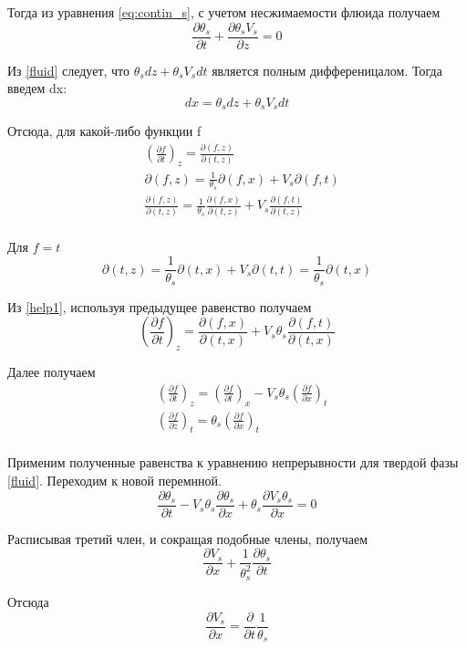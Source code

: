 \documentclass[12pt]{article}
\newcommand{\pd}[2]{\frac{\partial #1}{\partial #2}}
\begin{document}
Тогда из уравнения \eqref{eq:contin_s}, с учетом несжимаемости флюида получаем
\begin{equation}
\pd{\theta_s}{t} + \pd{\theta_s V_s}{z} = 0
\label{fluid}
\end{equation}

Из \eqref{fluid} следует, что $\theta_s dz + \theta_s V_s dt $ является полным дифференицалом. Тогда введем dx:
\begin{equation}
dx = \theta_s dz + \theta_s V_s dt
\label{dx_dz}
\end{equation}

Отсюда, для какой-либо функции f 
\begin{equation}
\begin{aligned}
&\left(\pd{f}{t}\right)_z = \pd{(f , z)}{(t , z)}\\
&\partial(f , z) = \frac{1}{\theta_s}\partial(f , x) + V_s \partial(f , t)\\
&\pd{(f , z)}{(t , z)} = \frac{1}{\theta_s}\pd{(f , x)}{(t , z)} + V_s\pd{(f , t)}{(t , z)}\\
\end{aligned}
\label{help1}
\end{equation}

Для $ f = t $ 
$$
\partial(t , z) = \frac{1}{\theta_s} \partial(t , x) + V_s \partial(t , t) = \frac{1}{\theta_s} \partial(t , x)
$$

Из \eqref{help1}, используя предыдущее равенство получаем
$$
\left(\pd{f}{t}\right)_z = \pd{(f , x)}{(t , x)} + V_s \theta_s\pd{(f ,t)}{(t , x)}
$$

Далее получаем
\begin{equation}
\begin{aligned}
&\left(\pd{f}{t}\right)_z = \left(\pd{f}{t}\right)_x - V_s\theta_s\left(\pd{f}{x}\right)_t\\
&\left(\pd{f}{z}\right)_t = \theta_s\left(\pd{f}{x}\right)_t\\
\end{aligned}
\label{z_x}
\end{equation}

Применим полученные равенства к уравнению непрерывности для твердой фазы \eqref{fluid}. Переходим к новой перемнной.
$$
\pd{\theta_s}{t} - V_s\theta_s\pd{\theta_s}{x} + \theta_s\pd{V_s\theta_s}{x} =0
$$

Расписывая третий член, и сокращая подобные члены, получаем
$$
\pd{V_s}{x} + \frac{1}{\theta_s^2}\pd{\theta_s}{t}
$$

Отсюда
\begin{equation}
\pd{V_s}{x} = \pd{}{t}\frac{1}{\theta_s}
\label{V_s}
\end{equation}
\end{document}
